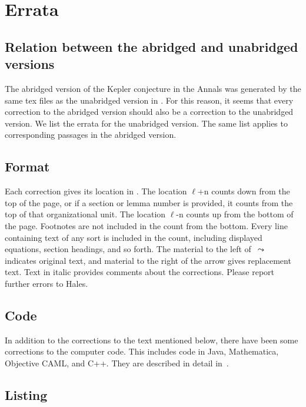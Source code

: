 \documentclass[11pt]{amsart}
\def\lto{\ensuremath{\,\leadsto\,}}
\def\line{$\ell$}
\begin{document}
{}\baselineskip
\section{Errata}


\subsection*{Relation between the abridged and unabridged versions}

The abridged version of the Kepler conjecture
in the Annals \cite{Hales:2005:Annals}
was generated by the same tex
files as the unabridged version in \cite{Hales:2006:DCG}.
For this reason,
it seems that every correction to
the abridged version should also be a correction to the unabridged version.
We list the errata for the
unabridged version. The same list applies to corresponding 
passages in the abridged version.  


\subsection*{Format}

Each correction gives its location in \cite{Hales:2006:DCG}.
The location
\line+n counts down from the top of the page, or
if a section or lemma number is provided, it
counts from the top of that organizational unit.
The location \line-n counts up from the bottom
of the page. Footnotes are not included in the
count from the bottom.  Every line containing
text of any sort is included in the count,
including displayed equations, section headings,
and so forth.  The material to the left of $\lto$ 
indicates original text, and material to the right of the
arrow gives replacement text.  Text in italic provides
comments about the corrections.  
Please report further errors to Hales.


\subsection*{Code}

In addition to the corrections to the text mentioned below, 
there have been some corrections to the computer code.
This includes code in Java, Mathematica, Objective CAML, and C++.
They are described in detail in~\cite{Hales:2008:Errata}.


\subsection*{Listing}\hfill\break
\end{document}
